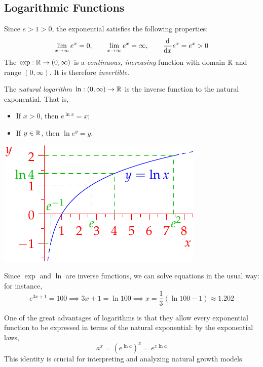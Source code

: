 \clearpage


\subsection{Logarithmic Functions}

Since $e>1>0$, the exponential satisfies the following properties:
\[\lim_{x\to\infty}e^x=0,\qquad \lim_{x\to\infty}e^x=\infty,\qquad \frac{\mathrm{d} }{\mathrm{d} x}e^x=e^x>0\]
The $\exp:\mathbb{R}\to(0,\infty)$ is a \emph{continuous, increasing} function with domain $\mathbb{R}$ and range $(0,\infty)$. It is therefore \emph{invertible.}


\begin{defn}[lower separated=false, sidebyside, sidebyside align=top seam, sidebyside gap=0pt, righthand width=0.4\linewidth]{}{}
The \emph{natural logarithm} $\ln:(0,\infty)\to\mathbb{R}$ is the inverse function to the natural exponential. That is,
\begin{itemize}
	\item If $x>0$, then $e^{\ln x}=x$;
	\item If $y\in\mathbb{R}$, then $\ln e^y=y$.
\end{itemize}
\tcblower
\flushright\includegraphics{log}
\end{defn}

Since $\exp$ and $\ln$ are inverse functions, we can solve equations in the usual way: for instance,
\[e^{3x+1}=100 \implies 3x+1=\ln 100\implies x=\frac 13(\ln 100-1) \approx 1.202\]



One of the great advantages of logarithms is that they allow every exponential function to be expressed in terms of the natural exponential: by the exponential laws,
\[a^x=(e^{\ln a})^x=e^{x\ln a}\]
This identity is crucial for interpreting and analyzing natural growth models.



